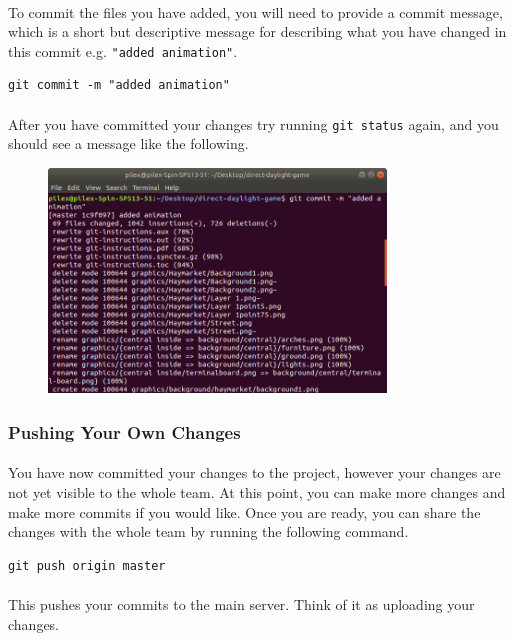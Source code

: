 \documentclass[11pt]{article}
\begin{document}
\paragraph{}
To commit the files you have added, you will need to provide a commit message, which is a short but descriptive message for describing what you have changed in this commit e.g. \lstinline{"added animation"}.
\begin{lstlisting}
git commit -m "added animation"
\end{lstlisting}
\paragraph{}
After you have committed your changes try running \lstinline{git status} again, and you should see a message like the following.
\begin{figure}[H]
\centering
\includegraphics[scale=1.0, width=0.8\textwidth]{latex-images/git2}
\caption{}
\end{figure}
\subsubsection{Pushing Your Own Changes}
\paragraph{}
You have now committed your changes to the project, however your changes are not yet visible to the whole team. At this point, you can make more changes and make more commits if you would like. Once you are ready, you can share the changes with the whole team by running the following command.
\begin{lstlisting}
git push origin master
\end{lstlisting}
\paragraph{}
This pushes your commits to the main server. Think of it as uploading your changes.
\end{document}
